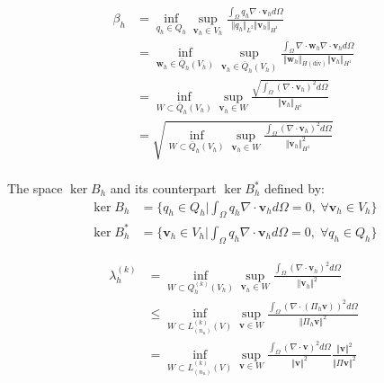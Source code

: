 \begin{equation}
\begin{split}
\beta_h &= \inf_{q_h \in Q_h} \sup_{\boldsymbol v_h \in V_h} \frac{\int_{\Omega} q_h \nabla \cdot \boldsymbol v_h d\Omega}{\Vert q_h \Vert_{L^2} \Vert \boldsymbol v_h \Vert_{H^1}} \\
    &= \inf_{\boldsymbol w_h \in \bar{Q}_h(V_h)} \sup_{\boldsymbol v_h \in \bar{Q}_h(V_h)} \frac{\int_{\Omega} \nabla \cdot \boldsymbol w_h \nabla \cdot \boldsymbol v_h d\Omega}{\Vert \boldsymbol w_h \Vert_{H(\textrm{div})} \Vert \boldsymbol v_h \Vert_{H^1}} \\ 
    &= \inf_{W \subset \bar{Q}_h(V_h)} \sup_{\boldsymbol v_h \in  W} \frac{\sqrt{ \int_{\Omega} (\nabla \cdot \boldsymbol v_h)^2 d\Omega}}{\Vert \boldsymbol v_h \Vert_{H^1}} \\
    &= \sqrt{\inf_{W \subset \bar{Q}_h(V_h)} \sup_{\boldsymbol v_h \in W} \frac{ \int_{\Omega} (\nabla \cdot \boldsymbol v_h)^2 d\Omega}{\Vert \boldsymbol v_h \Vert^2_{H^1}}} \\
\end{split}
\end{equation}

The space $\ker B_h$ and its counterpart $\ker  B_h^*$ defined by:
\begin{align}
    \ker B_h &= \{q_h \in Q_h \vert \int_{\Omega} q_h \nabla \cdot \boldsymbol v_h d\Omega = 0,\; \forall \boldsymbol v_h \in V_h\} \\
    \ker B_h^* &= \{\boldsymbol v_h \in V_h \vert \int_{\Omega} q_h \nabla \cdot \boldsymbol v_h d\Omega = 0,\; \forall q_h \in Q_h\}
\end{align} \par


\begin{equation}
\begin{split}
    \lambda^{(k)}_h &= \inf_{W \subset Q_h^{(k)}(V_h)} \sup_{\boldsymbol v_h \in W} \frac{\int_{\Omega} (\nabla \cdot \boldsymbol v_h)^2 d\Omega}{\Vert \boldsymbol v_h \Vert^2} \\
    &\le \inf_{W \subset L^{(k)}_{(n_u)}(V)} \sup_{\boldsymbol v \in W} \frac{\int_{\Omega} (\nabla \cdot (\Pi_h \boldsymbol v))^2 d\Omega}{\Vert \Pi_h \boldsymbol v \Vert^2} \\
    &= \inf_{W \subset L^{(k)}_{(n_u)}(V)} \sup_{\boldsymbol v \in W} \frac{\int_{\Omega} (\nabla \cdot \boldsymbol v)^2 d\Omega}{\Vert \boldsymbol v \Vert^2}
    \frac{\Vert \boldsymbol v \Vert^2}{\Vert \Pi \boldsymbol v \Vert^2}\\
\end{split}
\end{equation}

